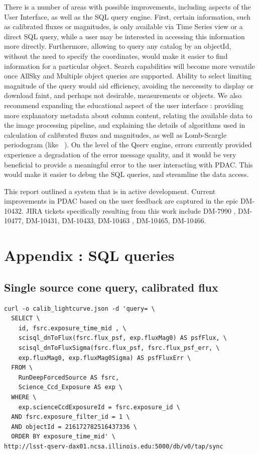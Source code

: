 \documentclass[DM,lsstdraft,toc]{lsstdoc}
\begin{document}
There is a number of areas with possible improvements,  including aspects of the User Interface, as well as the SQL query engine. First, certain information, such as calibrated fluxes or magnitudes, is only available via Time Series view or a direct SQL query, while a user may be interested in accessing this information more directly.  Furthermore, allowing to query any catalog by an objectId, without the need to specify the coordinates, would make it easier to find information for a particular object.  Search capabilities will become more versatile once AllSky and Multiple object queries are supported.  Ability to select limiting magnitude of the query would aid efficiency, avoiding the neccessity to display or download faint, and perhaps not desirable, measurements or objects.  We also recommend expanding the educational aspect of the user interface  : providing more explanatory metadata about column content, relating the available data to the image processing pipeline, and explaining the details of algorithms used in calculation of calibrated fluxes and magnitudes, as well as Lomb-Scargle periodogram (like ~\cite{2017arXiv170309824V}). On the level of the Qserv engine,  errors currently provided  experience a degradation of the error message quality, and it would be very beneficial to provide a meaningful error to the user interacting with PDAC. This would make it easier to debug the SQL queries, and streamline the data access.

This report outlined a system that is in active development. Current improvements in PDAC based on the user feedback are captured in the epic DM-10432. JIRA tickets specifically resulting from this work include DM-7990 , DM-10477, DM-10431, DM-10433, DM-10463 , DM-10465, DM-10466.

\appendix
\section{Appendix : SQL queries}

\subsection{Single source cone query, calibrated flux}
\label{sec:sql_single_flux}
\begin{lstlisting}
curl -o calib_lightcurve.json -d 'query= \
  SELECT \
    id, fsrc.exposure_time_mid , \
    scisql_dnToFlux(fsrc.flux_psf, exp.fluxMag0) AS psfFlux, \
    scisql_dnToFluxSigma(fsrc.flux_psf, fsrc.flux_psf_err, \
    exp.fluxMag0, exp.fluxMag0Sigma) AS psfFluxErr \
  FROM \
    RunDeepForcedSource AS fsrc,
    Science_Ccd_Exposure AS exp \
  WHERE \
    exp.scienceCcdExposureId = fsrc.exposure_id \
  AND fsrc.exposure_filter_id = 1 \
  AND objectId = 216172782516437336 \
  ORDER BY exposure_time_mid' \
http://lsst-qserv-dax01.ncsa.illinois.edu:5000/db/v0/tap/sync
\end{lstlisting}
\end{document}
